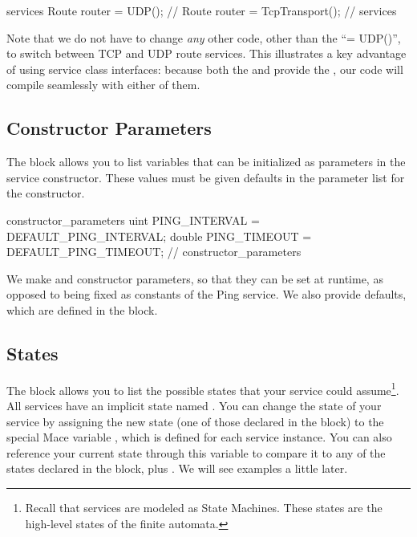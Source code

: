 \begin{programlisting}
services {
  Route router = UDP();
  //   Route router = TcpTransport();
} // services
\end{programlisting}

Note that we do not have to change \emph{any} other code, other than
the ``= UDP()'', to switch between TCP and UDP route
services.  This illustrates a key advantage of using service class
interfaces: because both the  and
 provide the , our
code will compile seamlessly with either of them.

\subsection{Constructor Parameters}

The  block allows you to list variables that
can be initialized as parameters in the service constructor.  These values
must be given defaults in the parameter list for the constructor.

\begin{programlisting}
constructor_parameters {
  uint PING_INTERVAL = DEFAULT_PING_INTERVAL;
  double PING_TIMEOUT = DEFAULT_PING_TIMEOUT;
} // constructor_parameters
\end{programlisting}

We make  and 
constructor parameters, so that they can be set at runtime, as opposed
to being fixed as constants of the Ping service.  We also provide
defaults, which are defined in the  block.


\subsection{States}

The  block allows you to list the possible states that your
service could assume\footnote{Recall that services are modeled as State
Machines.  These states are the high-level states of the finite automata.}.
All services have an implicit state named .  You can change the
state of your service by assigning the new state (one of those declared in the
 block) to the special Mace variable ,
which is defined for each service instance.  You can also reference your
current state through this variable to compare it to any of the states
declared in the  block, plus .  We will
see examples a little later.

